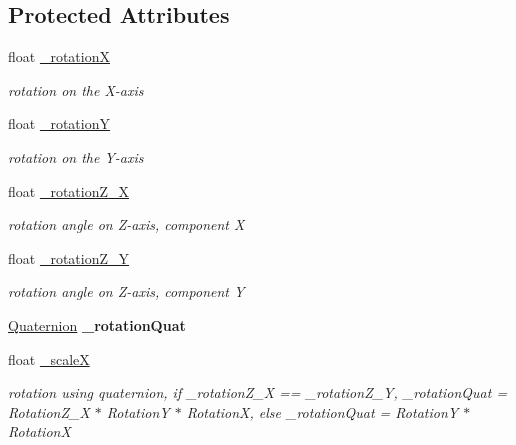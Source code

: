 \subsection*{Protected Attributes}
\begin{DoxyCompactItemize}
\item 
\mbox{\label{classNode_adfee8eadd0d490ec504b93e7a20056fc}} 
float \hyperlink{classNode_adfee8eadd0d490ec504b93e7a20056fc}{\+\_\+rotationX}
\begin{DoxyCompactList}\small\item\em rotation on the X-\/axis \end{DoxyCompactList}\item 
\mbox{\label{classNode_a196ed90f49ad52ebc93a3c7aaa36d209}} 
float \hyperlink{classNode_a196ed90f49ad52ebc93a3c7aaa36d209}{\+\_\+rotationY}
\begin{DoxyCompactList}\small\item\em rotation on the Y-\/axis \end{DoxyCompactList}\item 
\mbox{\label{classNode_aa32f8a9a49a41f2869cb9be336651dee}} 
float \hyperlink{classNode_aa32f8a9a49a41f2869cb9be336651dee}{\+\_\+rotation\+Z\+\_\+X}
\begin{DoxyCompactList}\small\item\em rotation angle on Z-\/axis, component X \end{DoxyCompactList}\item 
\mbox{\label{classNode_a56f697d7ec4bb08eb2608a1441918c64}} 
float \hyperlink{classNode_a56f697d7ec4bb08eb2608a1441918c64}{\+\_\+rotation\+Z\+\_\+Y}
\begin{DoxyCompactList}\small\item\em rotation angle on Z-\/axis, component Y \end{DoxyCompactList}\item 
\mbox{\label{classNode_a63558967572c6ac2fd197b15e7015c9b}} 
\hyperlink{classQuaternion}{Quaternion} {\bfseries \+\_\+rotation\+Quat}
\item 
float \hyperlink{classNode_ad297aabd4789b5bdb3ddff6034691edb}{\+\_\+scaleX}
\begin{DoxyCompactList}\small\item\em rotation using quaternion, if \+\_\+rotation\+Z\+\_\+X == \+\_\+rotation\+Z\+\_\+Y, \+\_\+rotation\+Quat = Rotation\+Z\+\_\+X $\ast$ RotationY $\ast$ RotationX, else \+\_\+rotation\+Quat = RotationY $\ast$ RotationX \end{DoxyCompactList}\item 

\end{DoxyCompactItemize}
